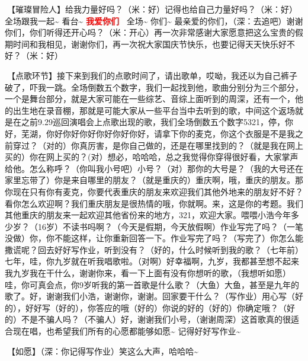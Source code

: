 \documentclass[
]{book}
\begin{document}
🎵【璀璨冒险人】给我力量好吗？（米：好）记得也给自己力量好吗？（米：好）全场跟我一起\textasciitilde{} 看台\textasciitilde{} \textbf{\textcolor{red}{我爱你们~} } 全场\textasciitilde{} 你们\textasciitilde{} 最亲爱的你们，（深：去追吧）谢谢你们，你们听得还开心吗？（米：开心）再一次非常感谢大家愿意把这么宝贵的假期时间和我相见，谢谢你们，再一次祝大家国庆节快乐，也要记得天天快乐好不好？（米：好）

🎵【点歌环节】接下来到我们的点歌时间了，请出歌单，哎呦，我还以为自己裤子破了，吓我一跳。全场倒数五个数字，我们一起找到他，歌曲分别分为三个部分，一个是舞台部分，就是大家可能在一些综艺、音综上面听到的周深，还有一个，他的出生地在录音棚，那就是可能大家从一些平台当中去听到的歌，中间这个返场就是在之前9.29巡回演唱会上点歌出现的歌，我们全场倒数五个数字5321，停，你好，芜湖，你好你好你好你好你好你好，请拿下你的麦克，你这个衣服是不是我之前穿过？（对的）你真厉害，是你自己做的，还是在哪里找到的？（就是我在网上买的）你在网上买的？(对）想必，哈哈哈，总之我觉得你穿得很好看，大家掌声给他。怎么称呼？（你叫我小号吧）小号？（对）那你的大号是？（我的大号还在家里忘带了）你是来自哪里的朋友？（就是重庆的）重庆啊，哦，重庆的朋友。那你现在只有你有麦克，你要代表重庆的朋友来欢迎我们其他外地来的朋友好不好？看你怎么欢迎啊？我们重庆朋友是很热情的哦，你就啊。来，这是你的考题。我们其他重庆的朋友来一起欢迎其他省份来的地方，321，欢迎大家。喂喂小浩今年多少岁？（16岁）不读书吗啊？（今天是假期，今天放假啊）作业写完了吗？（一笔没做）你，你不能这样，让你重新回答一下。作业写完了吗？（写完了）你怎么能撒谎呢？回去好好写作业，听到没有？（好的，什么时候听到我的歌？（七年前）七年，哇，你九岁就在听我唱歌啦。（对啊）好幸福啊，九岁，我都甚至想不起来我九岁我在干什么，谢谢你来，看一下上面有没有你想听的歌，（我想听如愿）哇，你可真会点，你9岁听我的第一首歌是什么歌？（大鱼）大鱼，甚至是九年的歌了。好，谢谢我们小浩，谢谢你，谢谢。回家要干什么？（写作业）用心写（好的），好好写（好的），你答应的哦（好的）你说的好的（好的）你确定哦？（好的）不是不骗人吗？（不骗人）好，谢谢我们小号，（谢谢周深）这首歌真的很适合现在唱，也希望我们所有的心愿都能够如愿\textasciitilde{} 记得好好写作业\textasciitilde{}

🎵【如愿】（深：你记得写作业）笑这么大声，哈哈哈\textasciitilde{}
\end{document}
